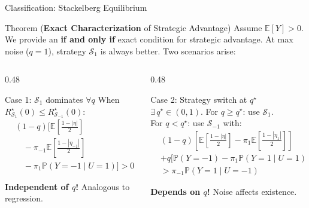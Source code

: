 \documentclass[aspectratio=169, 10pt]{beamer}
\newcommand{\E}{\mathbb{E}}
\newcommand{\Prob}{\mathbb{P}}
\newcommand{\cS}{\mathcal{S}}
\begin{document}
\begin{frame}{Classification: Stackelberg Equilibrium}
  \begin{block}{Theorem (\textbf{Exact Characterization} of Strategic Advantage)}
    Assume $\E[Y] > 0$. We provide an \textbf{if and only if} exact condition for strategic advantage. At max noise ($q=1$), strategy $\cS_1$ is always better. Two scenarios arise:
  \end{block}
  \vspace{1pt}
  \begin{columns}[T]
    \begin{column}{0.48\textwidth}
      \begin{exampleblock}{\centering Case 1: $\cS_1$ dominates $\forall q$}
        {\small When $R_{\cS_1}^\star(0) \le R_{\cS_{-1}}^\star(0)$:}
        \vspace{-6pt}
        \begin{align*}
          &(1{-}q)\biggl[\E\!\left[\tfrac{1-|\eta|}{2}\right]\\
          &\quad - \pi_{-1}\E\!\left[\tfrac{1-|\eta_{-1}|}{2}\right]\\
          &\quad - \pi_1\Prob(Y\!=\!{-1} \mid U\!=\!1)\biggr] > 0
        \end{align*}
        \vspace{-10pt}
        
        {\scriptsize \textcolor{successGreen}{\textbf{Independent of $q$!}} Analogous to regression.}
      \end{exampleblock}
    \end{column}
    \begin{column}{0.48\textwidth}
      \begin{alertblock}{\centering Case 2: Strategy switch at $q^\star$}
        {\small $\exists\, q^\star \in (0,1)$. For $q \ge q^\star$: use $\cS_1$. \\For $q < q^\star$: use $\cS_{-1}$ with:}
        \vspace{-6pt}
        \begin{align*}
          &(1{-}q)\!\left[\E\!\left[\tfrac{1-|\eta|}{2}\right] - \pi_1\E\!\left[\tfrac{1-|\eta_1|}{2}\right]\right]\\[-2pt]
          &+ q\big[\Prob(Y\!=\!{-1}) - \pi_1\Prob(Y\!=\!1 \mid U\!=\!1)\big]\\[-2pt]
          &> \pi_{-1}\Prob(Y\!=\!1 \mid U\!=\!{-1})
        \end{align*}
        \vspace{-10pt}
        
        {\scriptsize \textcolor{accentCoral}{\textbf{Depends on $q$!}} Noise affects existence.}
      \end{alertblock}
    \end{column}
  \end{columns}
\end{frame}
\end{document}
